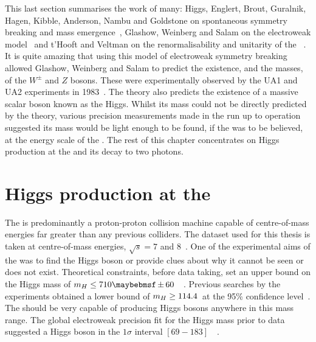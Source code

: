 This last section summarises the work of many: Higgs, Englert, Brout, Guralnik, Hagen, Kibble, Anderson, Nambu and Goldstone on spontaneous symmetry breaking and mass emergence~\cite{englert-brout,HagenKibble,Higgs:1964ia,Higgs,Nambu,Goldstone,Anderson}, Glashow, Weinberg and Salam on the electroweak model~\cite{Glashow,Weinberg,Salam} and t'Hooft and Veltman on the renormalisability and unitarity of the \SM~\cite{tHooft:1972fi,Hooft1971167}. It is quite amazing that using this model of electroweak symmetry breaking allowed Glashow, Weinberg and Salam to predict the existence, and the masses, of the $W^{\pm}$ and $Z$ bosons. These were experimentally observed by the UA1 and UA2 experiments in 1983~\cite{ua1,ua2}. The theory also predicts the existence of a massive scalar boson known as the Higgs. Whilst its mass could not be directly predicted by the theory, various precision measurements made in the run up to \LHC operation suggested its mass would be light enough to be found, if the \SM was to be believed, at the energy scale of the \LHC. The rest of this chapter concentrates on Higgs production at the \LHC and its decay to two photons. 

\section{Higgs production at the \LHC}

The \LHC is predominantly a proton-proton collision machine capable of centre-of-mass energies far greater than any previous colliders. The dataset used for this thesis is taken at centre-of-mass energies, $\sqrt{s}=7$ and 8~\TeV. One of the experimental aims of the \LHC was to find the Higgs boson or provide clues about why it cannot be seen or does not exist. Theoretical constraints, before \LHC data taking, set an upper bound on the \SM Higgs mass of $\mH\leq710\pm60$~\GeV~\cite{upper-higgs-bound}. Previous searches by the \LEP experiments obtained a lower bound of $m_{H}\geq114.4$~\GeV at the 95\% confidence level~\cite{lep-higgs}. The \LHC should be very capable of producing \SM Higgs bosons anywhere in this mass range. The global electroweak precision fit for the Higgs mass prior to \LHC data suggested a \SM Higgs boson in the $1\sigma$ interval $[69-183]$~\GeV~\cite{ewfits}.


